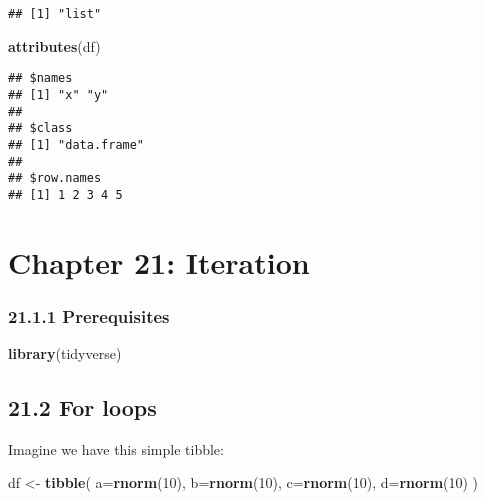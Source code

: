 \documentclass[
]{article}
\newenvironment{Shaded}{\begin{snugshade}}{\end{snugshade}}
\newcommand{\AttributeTok}[1]{\textcolor[rgb]{0.13,0.29,0.53}{#1}}
\newcommand{\DecValTok}[1]{\textcolor[rgb]{0.00,0.00,0.81}{#1}}
\newcommand{\FunctionTok}[1]{\textcolor[rgb]{0.13,0.29,0.53}{\textbf{#1}}}
\newcommand{\NormalTok}[1]{#1}
\newcommand{\OtherTok}[1]{\textcolor[rgb]{0.56,0.35,0.01}{#1}}
\begin{document}
\begin{verbatim}
## [1] "list"
\end{verbatim}

\begin{Shaded}
\begin{Highlighting}[]
\FunctionTok{attributes}\NormalTok{(df)}
\end{Highlighting}
\end{Shaded}

\begin{verbatim}
## $names
## [1] "x" "y"
## 
## $class
## [1] "data.frame"
## 
## $row.names
## [1] 1 2 3 4 5
\end{verbatim}

\hypertarget{chapter-21-iteration}{%
\section{Chapter 21: Iteration}\label{chapter-21-iteration}}

\hypertarget{prerequisites-1}{%
\subsubsection{21.1.1 Prerequisites}\label{prerequisites-1}}

\begin{Shaded}
\begin{Highlighting}[]
\FunctionTok{library}\NormalTok{(tidyverse)}
\end{Highlighting}
\end{Shaded}

\hypertarget{for-loops}{%
\subsection{21.2 For loops}\label{for-loops}}

Imagine we have this simple tibble:

\begin{Shaded}
\begin{Highlighting}[]
\NormalTok{df }\OtherTok{\textless{}{-}} \FunctionTok{tibble}\NormalTok{(}
  \AttributeTok{a=}\FunctionTok{rnorm}\NormalTok{(}\DecValTok{10}\NormalTok{),}
  \AttributeTok{b=}\FunctionTok{rnorm}\NormalTok{(}\DecValTok{10}\NormalTok{),}
  \AttributeTok{c=}\FunctionTok{rnorm}\NormalTok{(}\DecValTok{10}\NormalTok{),}
  \AttributeTok{d=}\FunctionTok{rnorm}\NormalTok{(}\DecValTok{10}\NormalTok{)}
\NormalTok{)}
\end{Highlighting}
\end{Shaded}
\end{document}
